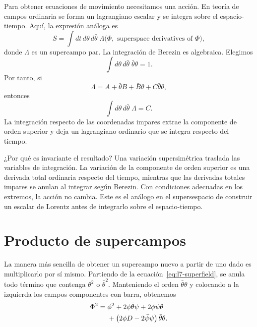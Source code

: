 Para obtener ecuaciones de movimiento necesitamos una acción. En teoría de campos ordinaria se forma un lagrangiano escalar y se integra sobre el espacio-tiempo. Aquí, la expresión análoga es
\begin{equation}
S=\int dt\,d\theta\,d\bar\theta\;\Lambda
\bigl(\Phi,\text{ superspace derivatives of }\Phi\bigr),
\label{eq:l7-superaction}
\end{equation}
donde \(\Lambda\) es un supercampo par. La integración de Berezin es algebraica. Elegimos
\begin{equation}
\int d\theta\,d\bar\theta\;\bar\theta\theta=1.
\end{equation}
Por tanto, si
\begin{equation}
\Lambda=A+\bar\theta B+\bar B\theta+C\bar\theta\theta,
\end{equation}
entonces
\begin{equation}
\int d\theta\,d\bar\theta\;\Lambda=C.
\label{eq:l7-top-component}
\end{equation}
La integración respecto de las coordenadas impares extrae la componente de orden superior y deja un lagrangiano ordinario que se integra respecto del tiempo.

¿Por qué es invariante el resultado? Una variación supersimétrica traslada las variables de integración. La variación de la componente de orden superior es una derivada total ordinaria respecto del tiempo, mientras que las derivadas totales impares se anulan al integrar según Berezin. Con condiciones adecuadas en los extremos, la acción no cambia. Este es el análogo en el supersespacio de construir un escalar de Lorentz antes de integrarlo sobre el espacio-tiempo.

\section{Producto de supercampos}

La manera más sencilla de obtener un supercampo nuevo a partir de uno dado es multiplicarlo por sí mismo. Partiendo de la ecuación~\eqref{eq:l7-superfield}, se anula todo término que contenga \(\theta^2\) o \(\bar\theta^2\). Manteniendo el orden \(\bar\theta\theta\) y colocando a la izquierda los campos componentes con barra, obtenemos
\begin{align}
\Phi^2
={}&\phi^2
+2\phi\bar\theta\psi
+2\phi\bar\psi\theta\notag\\
&+\left(2\phi D-2\bar\psi\psi\right)\bar\theta\theta.
\label{eq:l7-superfield-square}
\end{align}

